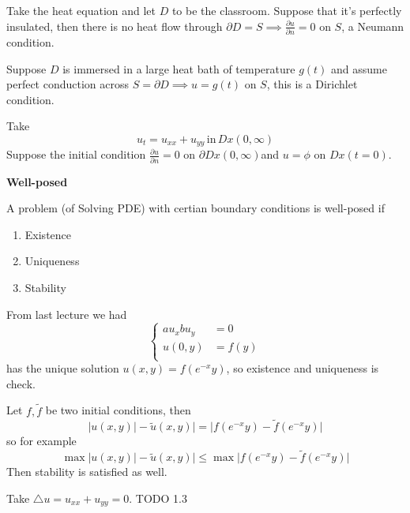 	\begin{example}
		Take the heat equation and let $D$ to be the classroom. Suppose that it's perfectly insulated, then there is no heat flow through $\partial D = S \implies \frac{\partial u}{\partial n} = 0 $ on $S$, a Neumann condition. 
	\end{example}
	\begin{example}
		Suppose $D$ is immersed in a large heat bath of temperature $g(t)$ and assume perfect conduction across $S = \partial D \implies u = g(t)$ on $S$, this is a Dirichlet condition.
	\end{example}
	\begin{example}
		Take 
		\[ u_{t} = u_{xx} + u_{yy} \, \mathrm{in}\, Dx(0, \infty)\]
		Suppose the initial condition $\frac{\partial u}{\partial n} = 0$ on $\partial Dx(0, \infty)$and $ u = \phi$ on $Dx(t = 0)$.
	\end{example}
\textbf{Well-posed}
\begin{definition}[informal]
	A problem (of Solving PDE) with certian boundary conditions is well-posed if
	\begin{enumerate}
		\item Existence
		\item Uniqueness
		\item Stability
	\end{enumerate}
\end{definition}
\begin{example}
	From last lecture we had
	\[ \left\{ \begin{array}{rl} 
		a u_{x} b u_{y}  &= 0  \\
		u(0,y) &= f(y)  \\
	\end{array} \right. \]
	has the unique solution $u(x,y) = f \left( e^{-x}y \right)$, so existence and uniqueness is check.

	Let $f, \tilde f$ be two initial conditions, then 
	\[ |u(x,y)| - \tilde u(x,y)|  = |f\left(e^{-x}y\right) - \tilde f \left( e^{-x} y \right)|\]
	so for example
	\[ \max|u(x,y)| - \tilde u(x,y)|  \leq \max|f\left(e^{-x}y\right) - \tilde f \left( e^{-x} y \right)|\]
	Then stability is satisfied as well.
\end{example}
\begin{example}
	Take $\triangle u = u_{xx} + u_{yy} = 0$. \huge TODO 1.3
\end{example}




